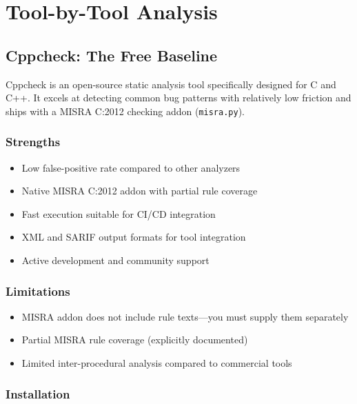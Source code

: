 \documentclass[11pt,letterpaper]{report}
\begin{document}
\chapter{Tool-by-Tool Analysis}

\section{Cppcheck: The Free Baseline}

Cppcheck is an open-source static analysis tool specifically designed for C and C++. It excels at detecting common bug patterns with relatively low friction and ships with a MISRA C:2012 checking addon (\texttt{misra.py}).

\subsection{Strengths}

\begin{itemize}[leftmargin=*]
    \item Low false-positive rate compared to other analyzers
    \item Native MISRA C:2012 addon with partial rule coverage
    \item Fast execution suitable for CI/CD integration
    \item XML and SARIF output formats for tool integration
    \item Active development and community support
\end{itemize}

\subsection{Limitations}

\begin{itemize}[leftmargin=*]
    \item MISRA addon does not include rule texts---you must supply them separately
    \item Partial MISRA rule coverage (explicitly documented)
    \item Limited inter-procedural analysis compared to commercial tools
\end{itemize}

\subsection{Installation}
\end{document}
